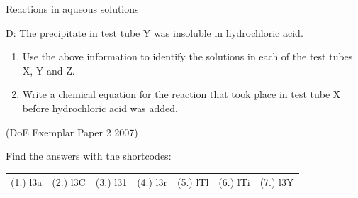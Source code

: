 \begin{eocexercises}{Reactions in aqueous solutions}
\begin{enumerate}[noitemsep, label=\textbf{\arabic*}. ]
D: The precipitate in test tube Y was insoluble in hydrochloric acid.
\label{m38719*id343466}\begin{enumerate}[noitemsep, label=\textbf{\alph*}. ] 
            \label{m38719*uid128}\item Use the above information to identify the solutions in each of the test tubes X, Y and Z.
\label{m38719*uid129}\item Write a chemical equation for the reaction that took place in test tube X before hydrochloric acid was added.
\end{enumerate}
(DoE Exemplar Paper 2 2007)
\end{enumerate}
\label{m38719**end}
  \label{4c7ba3bfe702f176850b0d58ba743465**end}
\par {} Find the answers with the shortcodes:
 \par \begin{tabular}[h]{cccccc}
 (1.) l3a  &  (2.) l3C  &  (3.) l31  &  (4.) l3r  &  (5.) lTl  &  (6.) lTi  &  (7.) l3Y  & \end{tabular}
\end{eocexercises}
